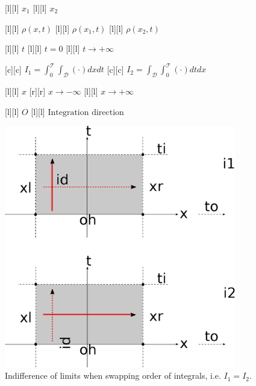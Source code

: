 \begin{figure}[ht]
	\centering
	\footnotesize


	[l] {$x_1$}
	[l] {$x_2$}

	[l] {$\rho(x,t)$}
	[l] {$\rho(x_{1},t)$}
	[l] {$\rho(x_{2},t)$}


	[l] {$t$}
	[l] {$t = 0$}
	[l] {$t \rightarrow +\infty$}


	[c] {$\displaystyle I_{1} = \int_{0}^{\mathscr{T}}\int_{\mathscr{D}} \left(\cdot\right)dxdt$}
	[c] {$\displaystyle I_{2} = \int_{\mathscr{D}}\int_{0}^{\mathscr{T}} \left(\cdot\right)dtdx$}

	[l] {$x$}
	[r] {$x\rightarrow -\infty$}
	[l] {$x\rightarrow +\infty$}

	[l] {$O$}
	[l] {$\text{Integration direction}$}

	\includegraphics[width=0.9\textwidth]{orderintegral.eps}
	\caption{Indifference of limits when swapping order of integrals, i.e. $I_{1} = I_{2}$.}
	\label{\LABEL}
\end{figure}
